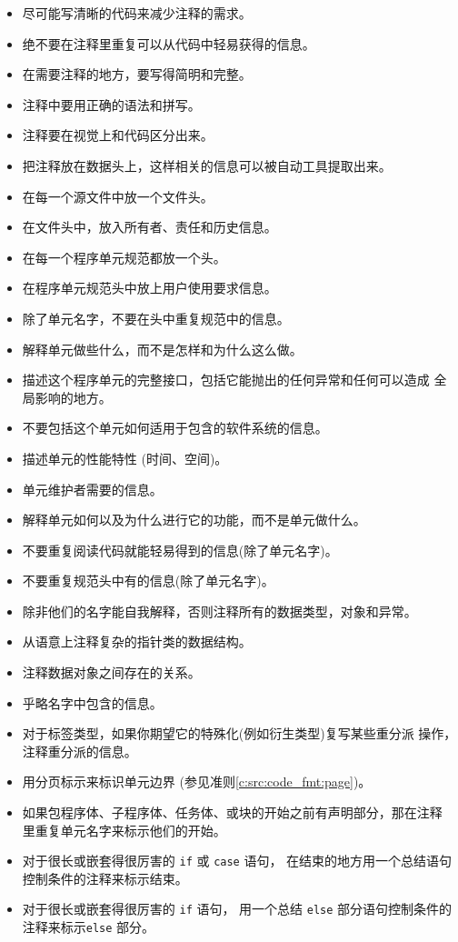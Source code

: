 \noindent
\begin{itemize}
    \item 尽可能写清晰的代码来减少注释的需求。
    \item 绝不要在注释里重复可以从代码中轻易获得的信息。
    \item 在需要注释的地方，要写得简明和完整。
    \item 注释中要用正确的语法和拼写。
    \item 注释要在视觉上和代码区分出来。
    \item 把注释放在数据头上，这样相关的信息可以被自动工具提取出来。

    \item 在每一个源文件中放一个文件头。
    \item 在文件头中，放入所有者、责任和历史信息。

    \item 在每一个程序单元规范都放一个头。
    \item 在程序单元规范头中放上用户使用要求信息。
    \item 除了单元名字，不要在头中重复规范中的信息。
    \item 解释单元做些什么，而不是怎样和为什么这么做。
    \item 描述这个程序单元的完整接口，包括它能抛出的任何异常和任何可以造成
全局影响的地方。
    \item 不要包括这个单元如何适用于包含的软件系统的信息。
    \item 描述单元的性能特性 (时间、空间)。

    \item 单元维护者需要的信息。
    \item 解释单元如何以及为什么进行它的功能，而不是单元做什么。
    \item 不要重复阅读代码就能轻易得到的信息(除了单元名字)。
    \item 不要重复规范头中有的信息(除了单元名字)。

    \item 除非他们的名字能自我解释，否则注释所有的数据类型，对象和异常。
    \item 从语意上注释复杂的指针类的数据结构。
    \item 注释数据对象之间存在的关系。
    \item 乎略名字中包含的信息。
    \item 对于标签类型，如果你期望它的特殊化(例如衍生类型)复写某些重分派
    操作，注释重分派的信息。

    \item 用分页标示来标识单元边界 (参见准则\ref{c:src:code_fmt:page})。
    \item 如果包程序体、子程序体、任务体、或块的开始之前有声明部分，那在注释
    里重复单元名字来标示他们的开始。
    \item 对于很长或嵌套得很厉害的 \texttt{if} 或 \texttt{case} 语句，
    在结束的地方用一个总结语句控制条件的注释来标示结束。
    \item 对于很长或嵌套得很厉害的 \texttt{if} 语句，
    用一个总结 \texttt{else} 部分语句控制条件的注释来标示\texttt{else} 部分。


\end{itemize}
